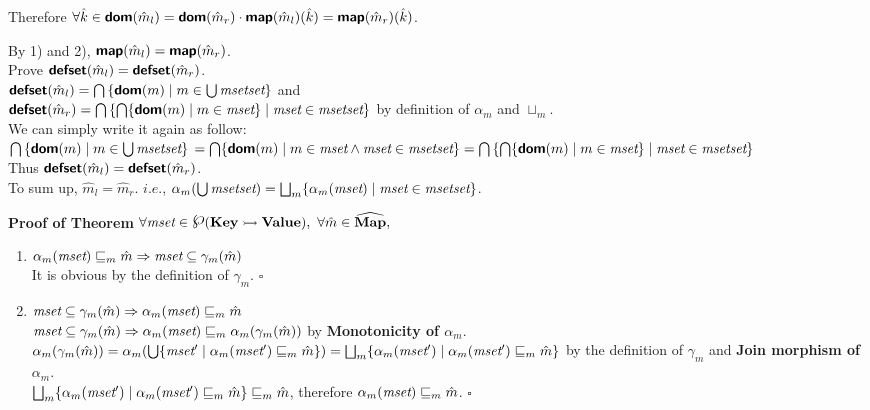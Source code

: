 \begin{itemize}
\begin{enumerate}[label={\arabic*)}]
Therefore $\forall \hat{k} \in \textsf{\textbf{dom}}(\hat{m}_l) = \textsf{\textbf{dom}}(\hat{m}_r) \cdot 
\textsf{\textbf{map}}(\hat{m}_l)(\hat{k}) = \textsf{\textbf{map}}(\hat{m}_r)(\hat{k})$.
\end{enumerate}
By 1) and 2), $\textsf{\textbf{map}}(\hat{m}_l) = \textsf{\textbf{map}}(\hat{m}_r)$. \vspace{2mm} \\
Prove $\textsf{\textbf{defset}}(\hat{m}_l) = \textsf{\textbf{defset}}(\hat{m}_r)$. \vspace{1mm} \\
$\textsf{\textbf{defset}}(\hat{m}_l) = \bigcap \left \{ \textsf{\textbf{dom}}(m) \mid m \in 
\bigcup \emph{msetset} \right \}$ and \\
$\textsf{\textbf{defset}}(\hat{m}_r) = \bigcap \left \{ \bigcap \{ \textsf{\textbf{dom}}(m) \mid m \in \emph{mset} \} \mid
\emph{mset} \in \emph{msetset} \right \}$ by definition of $\alpha_m$ and $\sqcup_m$. \vspace{1mm} \\
We can simply write it again as follow: \vspace{1mm} \\
$\bigcap \left \{ \textsf{\textbf{dom}}(m) \mid m \in \bigcup \emph{msetset} \right \} \\
= \bigcap \{ \textsf{\textbf{dom}}(m) \mid m \in \emph{mset} \land \emph{mset} \in \emph{msetset} \} \\
= \bigcap \left \{ \bigcap \{ \textsf{\textbf{dom}}(m) \mid m \in \emph{mset} \} \mid \emph{mset} \in \emph{msetset} \right \}$
\vspace{1mm} \\
Thus $\textsf{\textbf{defset}}(\hat{m}_l) = \textsf{\textbf{defset}}(\hat{m}_r)$. \vspace{1mm} \\
To sum up, $\hat{m}_l = \hat{m}_r$. $i.e.$, 
$\alpha_m(\bigcup \emph{msetset} )
=\bigsqcup_m\{ \alpha_m(\emph{mset}) \mid \emph{mset} \in \emph{msetset}\}$.
\end{itemize}
\textbf{Proof of Theorem }
$\forall \emph{mset} \in \poset(\CMap), ~ 
\forall \hat{m} \in \AMap, ~$
\begin{enumerate}[label={(\arabic*)}]
\item
$\alpha_m(\emph{mset}) \sqsubseteq_m \hat{m}
\Rightarrow
\emph{mset} \subseteq \gamma_m(\hat{m})$ \\
It is obvious by the definition of $\gamma_m$. \hfill $\square$
\item
$\emph{mset} \subseteq \gamma_m(\hat{m})
\Rightarrow
\alpha_m(\emph{mset}) \sqsubseteq_m \hat{m}$ \\
$\emph{mset} \subseteq \gamma_m(\hat{m})
\Rightarrow \alpha_m(\emph{mset}) \sqsubseteq_m \alpha_m(\gamma_m(\hat{m}))$
by \textbf{Monotonicity of $\alpha_m$}.\\
$\alpha_m(\gamma_m(\hat{m})) = 
\alpha_m(\bigcup\{ \emph{mset}' \mid \alpha_m(\emph{mset}') \sqsubseteq_m \hat{m}\}) = 
\bigsqcup_m\{\alpha_m(\emph{mset}') \mid \alpha_m(\emph{mset}') \sqsubseteq_m \hat{m} \}$
by the definition of $\gamma_m$ and \textbf{Join morphism of $\alpha_m$}. \\
$\bigsqcup_m\{\alpha_m(\emph{mset}') \mid \alpha_m(\emph{mset}') \sqsubseteq_m \hat{m} \}
\sqsubseteq_m \hat{m}$, therefore $\alpha_m(\emph{mset}) \sqsubseteq_m \hat{m}$. \hfill $\square$
\end{enumerate}
